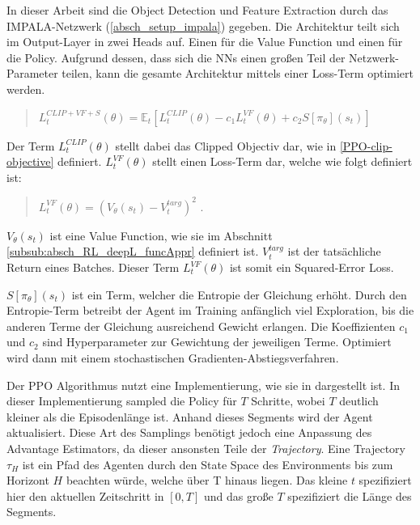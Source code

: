 In dieser Arbeit sind die Object Detection und Feature Extraction durch das IMPALA-Netzwerk (\ref{absch_setup_impala}) gegeben. Die Architektur teilt sich im Output-Layer in zwei Heads auf. Einen für die Value Function und einen für die Policy. Aufgrund dessen, dass sich die NNs einen großen Teil der Netzwerk-Parameter teilen, kann die gesamte Architektur mittels einer Loss-Term optimiert werden. 

\begin{quotation}
\centering
   \( L_t ^{CLIP+VF+S}(\theta) =  \mathbb{E}_t [L_t ^{CLIP}(\theta) - c_1 L_t ^{VF}(\theta) + c_2 S[\pi_{\theta}](s_t) ] \)
\end{quotation}

Der Term $ L_t ^{CLIP}(\theta) $ stellt dabei das Clipped Objectiv dar, wie in \ref{PPO-clip-objective} definiert. $ L_t ^{VF}(\theta) $ stellt einen Loss-Term dar, welche wie folgt definiert ist:
\begin{quotation}
\centering
   \(  L_t ^{VF}(\theta) = (V_{\theta}(s_t) - V_t ^{targ})^2  \) .
\end{quotation}

$V_{\theta}(s_t)$ ist eine Value Function, wie sie im Abschnitt \ref{subsub:absch_RL_deepL_funcAppr} definiert ist. $V_t ^{targ}$ ist der tatsächliche Return eines Batches. Dieser Term $ L_t ^{VF}(\theta) $ ist somit ein Squared-Error Loss. 

$ S[\pi_{\theta}](s_t) $ ist ein Term, welcher die Entropie der Gleichung erhöht. Durch den Entropie-Term betreibt der Agent im Training anfänglich viel Exploration, bis die anderen Terme der Gleichung ausreichend Gewicht erlangen. Die Koeffizienten $c_1$ und $c_2$ sind Hyperparameter zur Gewichtung der jeweiligen Terme. Optimiert wird dann mit einem stochastischen Gradienten-Abstiegsverfahren.

Der PPO Algorithmus nutzt eine Implementierung, wie sie in \cite{mnih2016asynchronous} dargestellt ist. In dieser Implementierung sampled die Policy für $ T $ Schritte, wobei $T$ deutlich kleiner als die Episodenlänge ist. Anhand dieses Segments wird der Agent aktualisiert. Diese Art des Samplings benötigt jedoch eine Anpassung des Advantage Estimators, da dieser ansonsten Teile der \emph{Trajectory}. Eine Trajectory $\tau_H$ ist ein Pfad des Agenten durch den State Space des Environments bis zum Horizont $H$ beachten würde, welche über T hinaus liegen. Das kleine $t$ spezifiziert hier den aktuellen Zeitschritt in $[0,T]$ und das große $T$ spezifiziert die Länge des Segments. 

